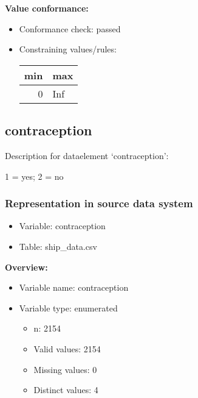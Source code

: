 \documentclass[
]{article}
\providecommand{\tightlist}{%
  \setlength{\itemsep}{0pt}\setlength{\parskip}{0pt}}
\begin{document}
\textbf{Value conformance:}

\begin{itemize}
\tightlist
\item
  Conformance check: passed
\item
  Constraining values/rules:

  \begin{table}[H]
  \centering
  \begin{tabular}{r|l}
  \hline
  \textbf{min} & \textbf{max}\\
  \hline
  0 & Inf\\
  \hline
  \end{tabular}
  \end{table}
\end{itemize}

\newpage

\hypertarget{contraception}{%
\subsection{contraception}\label{contraception}}

Description for dataelement `contraception':

1 = yes; 2 = no

\hypertarget{representation-in-source-data-system-2}{%
\subsubsection{\texorpdfstring{Representation in \textbf{source} data
system}{Representation in source data system}}\label{representation-in-source-data-system-2}}

\begin{itemize}
\tightlist
\item
  Variable: contraception
\item
  Table: ship\_data.csv
\end{itemize}

\textbf{Overview:}

\begin{itemize}
\tightlist
\item
  Variable name: contraception
\item
  Variable type: enumerated

  \begin{itemize}
  \tightlist
  \item
    n: 2154
  \item
    Valid values: 2154
  \item
    Missing values: 0
  \item
    Distinct values: 4
  \end{itemize}
\end{itemize}
\end{document}
